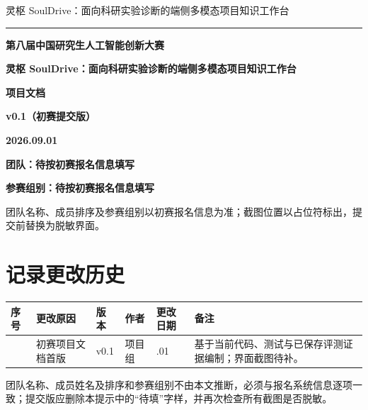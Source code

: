 \documentclass[UTF8,12pt]{ctexart}
\newcommand{\ProjectTitle}{灵枢 SoulDrive：面向科研实验诊断的端侧多模态项目知识工作台}
\newcommand{\TeamField}{待按初赛报名信息填写}
\newcommand{\TrackField}{待按初赛报名信息填写}
\newcommand{\VersionField}{v0.1（初赛提交版）}
\begin{document}

\begin{titlepage}
  \thispagestyle{empty}
  \begin{center}
    {\small\color{sdmuted}\ProjectTitle\par}
    \vspace{0.12cm}
    {\color{sdgreen}\rule{0.82\textwidth}{0.7pt}\par}
    \vspace{2.15cm}
    {\bfseries 第八届中国研究生人工智能创新大赛\par}
    \vspace{1.25cm}
    {\bfseries \ProjectTitle\par}
    \vspace{0.75cm}
    {\bfseries 项目文档\par}
    \vspace{0.45cm}
    {\large\bfseries \VersionField\par}
    \vfill
    {\large\bfseries 2026.09.01\par}
    \vspace{0.28cm}
    {\large\bfseries 团队：\TeamField\par}
    \vspace{0.18cm}
    {\large\bfseries 参赛组别：\TrackField\par}
    \vspace{0.8cm}
    \begin{minipage}{0.82\textwidth}
      \small\color{sdmuted}\centering
      团队名称、成员排序及参赛组别以初赛报名信息为准；截图位置以占位符标出，提交前替换为脱敏界面。
    \end{minipage}
  \end{center}
\end{titlepage}

\renewcommand{\contentsname}{目录}
\tableofcontents
\clearpage

\section*{记录更改历史}
\begin{center}
\small
\begin{tabularx}{\textwidth}{>{\centering\arraybackslash}p{}
  >{\raggedright\arraybackslash}p{}
  >{\centering\arraybackslash}p{}
  >{\centering\arraybackslash}p{}
  >{\centering\arraybackslash}p{}
  >{\raggedright\arraybackslash}X}
\toprule
序号 & 更改原因 & 版本 & 作者 & 更改日期 & 备注\\
\midrule
1 & 初赛项目文档首版 & v0.1 & 项目组 & 2026.09.01 & 基于当前代码、测试与已保存评测证据编制；界面截图待补。\\
\bottomrule
\end{tabularx}
\end{center}
\vfill
\begin{warnbox}[title={提交前字段检查}]
团队名称、成员姓名及排序和参赛组别不由本文推断，必须与报名系统信息逐项一致；提交版应删除本提示中的“待填”字样，并再次检查所有截图是否脱敏。
\end{warnbox}
\clearpage
{}
\end{document}
